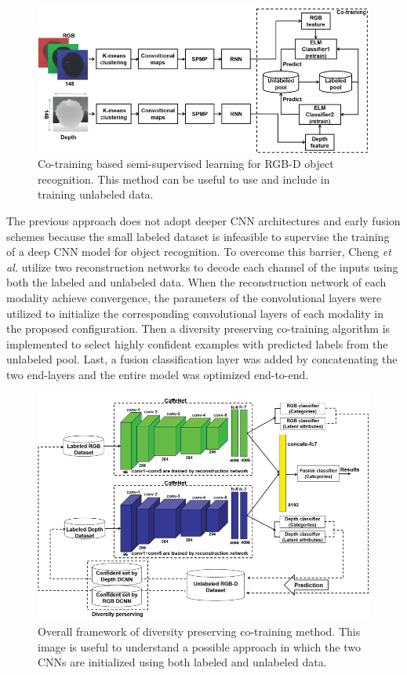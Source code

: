 \begin{figure}[h!]
	\centering
	\includegraphics[width=0.7\linewidth]{images/cnn_rnn_semi_super.png}
	\caption{Co-training based semi-supervised learning for RGB-D object recognition. This method can be useful to use and include in training unlabeled data.}
\end{figure}

\newpage

The previous approach does not adopt deeper CNN architectures and early fusion schemes because the small labeled dataset is infeasible to supervise the training of a deep CNN model for object recognition. To overcome this barrier, Cheng \textit{et al.} \cite{cheng2016semi-supervised} utilize two reconstruction networks to decode each channel of the inputs using both the labeled and unlabeled data. When the reconstruction network of each modality
achieve convergence, the parameters of the convolutional
layers were utilized to initialize the corresponding convolutional layers of each modality in the proposed configuration. Then a diversity preserving co-training algorithm is implemented to select highly confident examples with predicted labels from the unlabeled pool. Last, a fusion classification layer was added by concatenating the two end-layers and the entire model was optimized end-to-end. 

\begin{figure}[h!]
	\centering
	\includegraphics[width=0.7\linewidth]{images/semi_super_all.png}
	\caption{Overall framework of diversity preserving co-training method. This image is useful to understand a possible approach in which the two CNNs are initialized using both labeled and unlabeled data.}
\end{figure}

